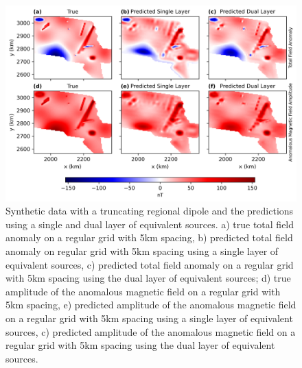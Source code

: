 \begin{figure}[tb!]
\centering
\includegraphics[width=1\linewidth]{figures/truncated_regional.png}
\caption{
    Synthetic data with a truncating regional dipole and the predictions using a single and dual layer of equivalent sources. a) true total field anomaly on a regular grid with 5km spacing, b) predicted total field anomaly on regular grid with 5km spacing using a single layer of equivalent sources, c) predicted total field anomaly on a regular grid with 5km spacing using the dual layer of equivalent sources; d) true amplitude of the anomalous magnetic field on a regular grid with 5km spacing, e) predicted amplitude of the anomalous magnetic field on a regular grid with 5km spacing using a single layer of equivalent sources, c) predicted amplitude of the anomalous magnetic field on a regular grid with 5km spacing using the dual layer of equivalent sources.
}
\label{fig:truncated_regional}
\end{figure}

